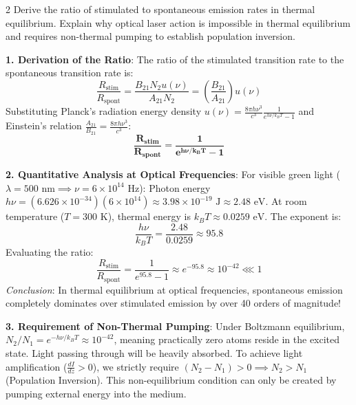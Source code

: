 \begin{theoryq}{2}
Derive the ratio of stimulated to spontaneous emission rates in thermal equilibrium. Explain why optical laser action is impossible in thermal equilibrium and requires non-thermal pumping to establish population inversion.
\end{theoryq}
\begin{theorysol}
\textbf{1. Derivation of the Ratio}:
The ratio of the stimulated transition rate to the spontaneous transition rate is:
\begin{equation}
\frac{R_{\text{stim}}}{R_{\text{spont}}} = \frac{B_{21} N_2 u(\nu)}{A_{21} N_2} = \left(\frac{B_{21}}{A_{21}}\right)u(\nu)
\end{equation}
Substituting Planck's radiation energy density $u(\nu) = \frac{8\pi h \nu^3}{c^3}\frac{1}{e^{h\nu/k_BT} - 1}$ and Einstein's relation $\frac{A_{21}}{B_{21}} = \frac{8\pi h\nu^3}{c^3}$:
\begin{equation}
\mathbf{\frac{R_{\text{stim}}}{R_{\text{spont}}} = \frac{1}{e^{h\nu/k_BT} - 1}}
\end{equation}

\textbf{2. Quantitative Analysis at Optical Frequencies}:
For visible green light ($\lambda = 500\text{ nm} \implies \nu = 6 \times 10^{14}\text{ Hz}$):
Photon energy $h\nu = (6.626 \times 10^{-34})(6 \times 10^{14}) \approx 3.98 \times 10^{-19}\text{ J} \approx 2.48\text{ eV}$.
At room temperature ($T = 300\text{ K}$), thermal energy is $k_B T \approx 0.0259\text{ eV}$.
The exponent is:
\begin{equation}
\frac{h\nu}{k_BT} = \frac{2.48}{0.0259} \approx 95.8
\end{equation}
Evaluating the ratio:
\begin{equation}
\frac{R_{\text{stim}}}{R_{\text{spont}}} = \frac{1}{e^{95.8} - 1} \approx e^{-95.8} \approx 10^{-42} \lll 1
\end{equation}
\textit{Conclusion}: In thermal equilibrium at optical frequencies, spontaneous emission completely dominates over stimulated emission by over 40 orders of magnitude!

\textbf{3. Requirement of Non-Thermal Pumping}:
Under Boltzmann equilibrium, $N_2/N_1 = e^{-h\nu/k_BT} \approx 10^{-42}$, meaning practically zero atoms reside in the excited state. Light passing through will be heavily absorbed.
To achieve light amplification ($\frac{dI}{dz} > 0$), we strictly require $(N_2 - N_1) > 0 \implies N_2 > N_1$ (Population Inversion). This non-equilibrium condition can only be created by pumping external energy into the medium.
\end{theorysol}
\vspace{4mm}


